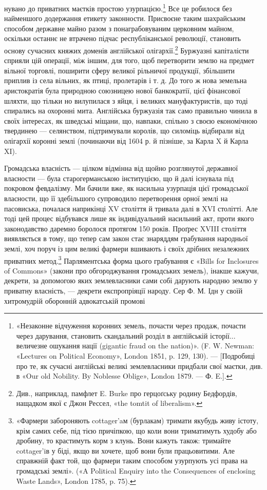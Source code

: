 нувано до приватних маєтків простою узурпацією.\footnote{
«Незаконне відчуження коронних земель, почасти через продаж,
почасти через дарування, становить скандальний розділ в англійській
історії... величезне ошукання нації (gigantic fraud on the nation)».
(F. W. Newman: «Lectures on Political Economy», London 1851, p. 129,
130). — [Подробиці про те, як сучасні англійські великі землевласники
придбали свої маєтки, див. в «Our old Nobility. By Noblesse Oblige», London
1879. — Ф. E.].
} Все це
робилося без найменшого додержання етикету законности. Присвоєне
таким шахрайським способом державне майно разом з
понаграбовуваним церковним майном, оскільки останнє не втрачено
підчас республіканської революції, становить основу сучасних
княжих доменів англійської олігархії.\footnote{
Див., наприклад, памфлет E. Burke про герцоґську родину
Бедфордів, нащадком якої є Джон Рессел, «the tomtit of liberalism».
} Буржуазні
капіталісти сприяли цій операції, між іншим, для того, щоб
перетворити землю на предмет вільної торговлі, поширити сферу
великої рільничої продукції, збільшити приплив із села вільних,
як птиці, пролетарів і т. д. До того ж нова земельна аристократія
була природною союзницею нової банкократії, цієї фінансової
шляхти, що тільки но вилупилася з яйця, і великих мануфактуристів,
що тоді спирались на охоронні мита. Англійська буржуазія
так само правильно чинила в своїх інтересах, як шведські
міщани, що, навпаки, спільно з своєю економічною твердинею
— селянством, підтримували королів, що силоміць відбирали
від олігархії коронні землі (починаючи від 1604 р. й
пізніше, за Карла X й Карла XI).

Громадська власність — цілком відмінна від щойно розглянутої
державної власности — була старогерманською інституцією,
що й далі існувала під покровом февдалізму. Ми бачили
вже, як насильна узурпація цієї громадської власности, що її
здебільшого супроводило перетворення орної землі на пасовиська,
почалася наприкінці XV століття й тривала далі в XVI столітті.
Але тоді цей процес відбувався лише як індивідуальний
насильний акт, проти якого законодавство даремно боролося протягом
150 років. Проґрес XVIII століття виявляється в тому,
що тепер сам закон стає знаряддям грабування народньої землі,
хоч поруч із цим великі фармери вшивають і своїх дрібних незалежних
приватних метод.\footnote{
«Фармери забороняють cottager’aм (бурлакам) тримати якубудь
живу істоту, крім самих себе, під тією причіпкою, що коли вони триматимуть
худобу або дробину, то крастимуть корм з клунь. Вони кажуть
також: тримайте cottager’iв у біді, якщо ви хочете, щоб вони були працьовитими.
Але справжній факт той, що фармери таким способом узурпують
усі права на громадські землі». («A Political Enquiry into the Consequences
of enclosing Waste Lands», London 1785, p. 75).
} Парляментська форма цього грабування
є «Bills for Inclosures of Commons» (закони про обгороджування
громадських земель), інакше кажучи, декрети, за допомогою
яких землевласники сами собі дарують народню землю
у приватну власність, — декрети експропріяції народу. Сер Ф. М.
Ідн у своїй хитромудрій оборонній адвокатській промові
